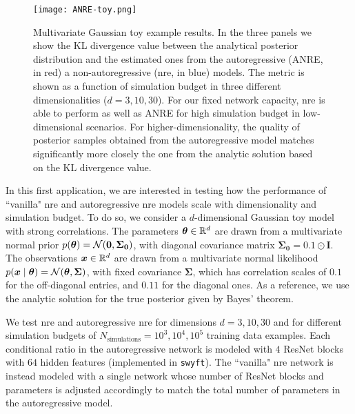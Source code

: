 \begin{figure}
\centering
\texttt{[image: ANRE-toy.png]}
\caption{
 Multivariate Gaussian toy example results. In the three panels we show the KL divergence value between the analytical posterior distribution and the estimated ones from the autoregressive (ANRE, in red) a non-autoregressive (\gls*{nre}, in blue) models. The metric is shown as a function of simulation budget in three different dimensionalities ($d=3, 10, 30$). For our fixed network capacity, \gls*{nre} is able to perform as well as ANRE for high simulation budget in low-dimensional scenarios. For higher-dimensionality, the quality of posterior samples obtained from the autoregressive model matches significantly more closely the one from the analytic solution based on the KL divergence value.}
\label{fig:toy}
\end{figure}

 In this first application, we are interested in testing how the performance of ``vanilla" \gls*{nre} and autoregressive \gls*{nre} models scale with dimensionality and simulation budget. To do so, we consider a $d$-dimensional Gaussian toy model with strong correlations. The parameters $\bm{\theta} \in \mathbb{R}^d$ are drawn from a multivariate normal prior $p(\bm{\theta})=\mathcal{N}(\mathbf 0, \mathbf{\Sigma_0})$, with diagonal covariance matrix $\mathbf{\Sigma_0}= 0.1 \odot \mathbf I$. The observations $\bm{x} \in \mathbb{R}^d$ are drawn from a multivariate normal likelihood $p(\bm{x} \mid \bm{\theta})= \mathcal{N}(\bm{\theta}, \mathbf{\Sigma})$, with fixed covariance $\mathbf{\Sigma}$, which has correlation scales of $0.1$ for the off-diagonal entries, and $0.11$ for the diagonal ones. As a reference, we use the analytic solution for the true posterior given by Bayes' theorem.

We test \gls*{nre} and autoregressive \gls*{nre} for dimensions $d = 3, 10, 30$ and for different simulation budgets of $N_\mathrm{simulations} =10^3, 10^4, 10^5$ training data examples. Each conditional ratio in the autoregressive network is modeled with $4$ ResNet \cite{He:2015wrn} blocks with $64$ hidden features (implemented in \texttt{swyft}). The ``vanilla" \gls*{nre} network is instead modeled with a single network whose number of ResNet blocks and parameters is adjusted accordingly to match the total number of parameters in the autoregressive model. 


